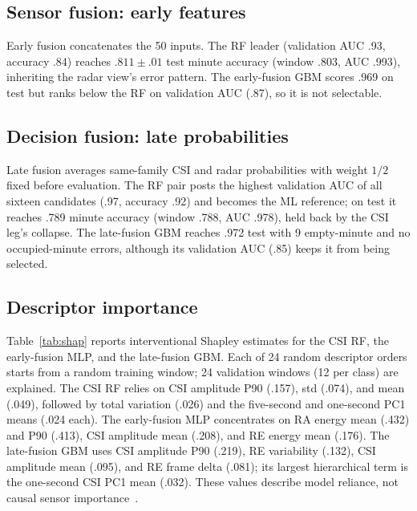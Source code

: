 \documentclass[conference,10pt,letterpaper]{IEEEtran}
\begin{document}
\subsection{Sensor fusion: early features}
Early fusion concatenates the 50 inputs. The RF leader (validation AUC .93, accuracy .84) reaches $.811\pm.01$ test minute accuracy (window .803, AUC .993), inheriting the radar view's error pattern. The early-fusion GBM scores .969 on test but ranks below the RF on validation AUC (.87), so it is not selectable.

\subsection{Decision fusion: late probabilities}
Late fusion averages same-family CSI and radar probabilities with weight $1/2$ fixed before evaluation. The RF pair posts the highest validation AUC of all sixteen candidates (.97, accuracy .92) and becomes the ML reference; on test it reaches .789 minute accuracy (window .788, AUC .978), held back by the CSI leg's collapse. The late-fusion GBM reaches .972 test with 9 empty-minute and no occupied-minute errors, although its validation AUC (.85) keeps it from being selected.

\subsection{Descriptor importance}
Table~\ref{tab:shap} reports interventional Shapley estimates for the CSI RF, the early-fusion MLP, and the late-fusion GBM. Each of 24 random descriptor orders starts from a random training window; 24 validation windows (12 per class) are explained. The CSI RF relies on CSI amplitude P90 (.157), std (.074), and mean (.049), followed by total variation (.026) and the five-second and one-second PC1 means (.024 each). The early-fusion MLP concentrates on RA energy mean (.432) and P90 (.413), CSI amplitude mean (.208), and RE energy mean (.176). The late-fusion GBM uses CSI amplitude P90 (.219), RE variability (.132), CSI amplitude mean (.095), and RE frame delta (.081); its largest hierarchical term is the one-second CSI PC1 mean (.032). These values describe model reliance, not causal sensor importance~\cite{shap}.

\begin{table}[!t]
\centering\scriptsize\setlength{\tabcolsep}{1.2pt}
\caption{Mean absolute interventional Shapley contribution to occupied probability for the CSI RF (C-RF), the early-fusion MLP (E-MLP), and the late-fusion GBM (L-GBM); 24 validation windows, training-window background}
\label{tab:shap}
\end{table}
\end{document}

